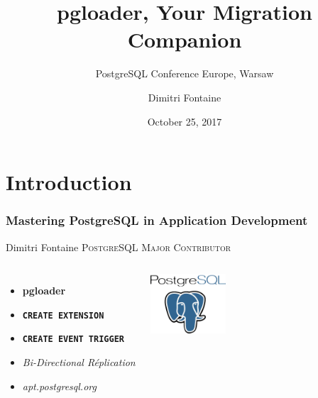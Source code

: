 \documentclass[xcolor=dvipsnames]{beamer}
\title{pgloader, Your Migration Companion}
\subtitle{PostgreSQL Conference Europe, Warsaw}
\author{Dimitri Fontaine}
\institute{\href{http://MasteringPostgreSQL.com/}{Mastering PostgreSQL}}
\date{October 25, 2017}
\begin{document}
\section{Introduction}

\frame{\titlepage}

\begin{frame}[fragile]
  \frametitle{Mastering PostgreSQL in Application Development}

  \begin{center}
    {\Huge Dimitri Fontaine}
    \vfill
    {\Large \textsc{PostgreSQL Major Contributor}}
  \end{center}

\begin{columns}[c]

  \begin{itemize}
   \item \textbf{pgloader}
   \item \texttt{\textbf{CREATE EXTENSION}}
   \item \texttt{\textbf{CREATE EVENT TRIGGER}}
   \item \textit{Bi-Directional Réplication}
   \item \textit{apt.postgresql.org}
  \end{itemize}  

\begin{center}
  \includegraphics[height=6em]{postgres-logo.png}
\end{center}
\end{columns}
\end{frame}
\end{document}
